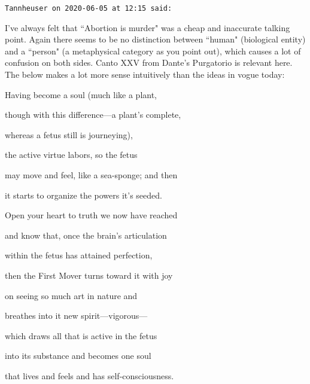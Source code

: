 \begin{footnotesize}\begin{sffamily}



\texttt{Tannheuser on 2020-06-05 at 12:15 said: }

I've always felt that ``Abortion is murder" was a cheap and inaccurate talking point. Again there seems to be no distinction between ``human" (biological entity) and a ``person" (a metaphysical category as you point out), which causes a lot of confusion on both sides. Canto XXV from Dante's Purgatorio is relevant here. The below makes a lot more sense intuitively than the ideas in vogue today:

Having become a soul (much like a plant,

though with this difference—a plant's complete,

whereas a fetus still is journeying),

the active virtue labors, so the fetus

may move and feel, like a sea-sponge; and then

it starts to organize the powers it's seeded.

Open your heart to truth we now have reached

and know that, once the brain's articulation

within the fetus has attained perfection,

then the First Mover turns toward it with joy

on seeing so much art in nature and

breathes into it new spirit—vigorous—

which draws all that is active in the fetus

into its substance and becomes one soul

that lives and feels and has self-consciousness.


\end{sffamily}\end{footnotesize}

